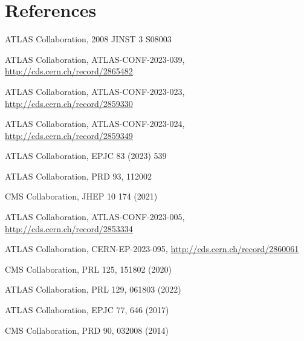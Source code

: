 \documentclass{v23windows}
\begin{document}
\section*{References}

\begin{thebibliography}{99}
 ATLAS Collaboration, 2008 JINST 3 S08003

 ATLAS Collaboration, ATLAS-CONF-2023-039, \url{http://cds.cern.ch/record/2865482}

 ATLAS Collaboration, ATLAS-CONF-2023-023, \url{http://cds.cern.ch/record/2859330}

 ATLAS Collaboration, ATLAS-CONF-2023-024, \url{http://cds.cern.ch/record/2859349}

 ATLAS Collaboration, EPJC 83 (2023) 539

 ATLAS Collaboration, PRD 93, 112002

 CMS Collaboration, JHEP 10 174 (2021)

 ATLAS Collaboration, ATLAS-CONF-2023-005, \url{http://cds.cern.ch/record/2853334}

 ATLAS Collaboration, CERN-EP-2023-095, \url{http://cds.cern.ch/record/2860061}

 CMS Collaboration, PRL 125, 151802 (2020)

 ATLAS Collaboration, PRL 129, 061803 (2022)

 ATLAS Collaboration, EPJC 77, 646 (2017)

 CMS Collaboration, PRD 90, 032008 (2014)

\end{thebibliography}
\end{document}
